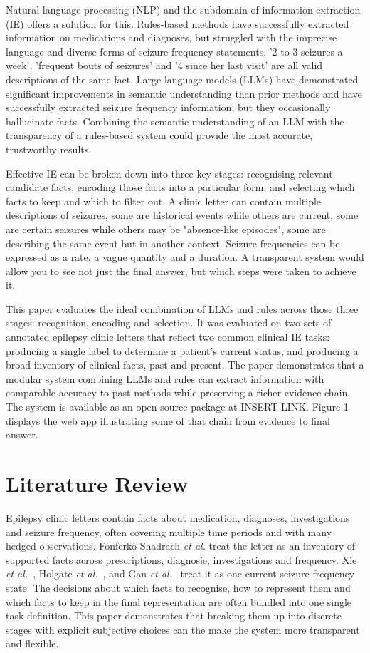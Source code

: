 \documentclass[conference]{IEEEtran}
\begin{document}
Natural language processing (NLP) and the subdomain
of information extraction (IE) offers a solution for this. 
Rules-based methods have successfully extracted
information on medications and diagnoses, but struggled
with the imprecise language and diverse forms
of seizure frequency statements. '2 to 3 seizures a week', 
'frequent bouts of seizures' and '4 since her last visit' are
all valid descriptions of the same fact. Large language 
models (LLMs) have demonstrated significant 
improvements in semantic understanding than prior 
methods and have successfully extracted seizure 
frequency information, but they occasionally hallucinate
facts. Combining the semantic understanding of an LLM
with the transparency of a rules-based system could
provide the most accurate, trustworthy results.

Effective IE can be broken down into three key stages: 
recognising relevant candidate facts, encoding those facts 
into a particular form, and selecting which facts to keep 
and which to filter out. A clinic letter can contain multiple 
descriptions of seizures, some are historical events while 
others are current, some are certain seizures while others 
may be "absence-like episodes", some are describing the 
same event but in another context. Seizure frequencies 
can be expressed as a rate, a vague quantity and a 
duration. A transparent system would allow you to see not 
just the final answer, but which steps were taken to achieve 
it.

This paper evaluates the ideal combination of LLMs and 
rules across those three stages: recognition, encoding and 
selection. It was evaluated on two sets of annotated 
epilepsy clinic letters that reflect two common clinical IE 
tasks: producing a single label to determine a patient's 
current status, and producing a broad inventory of clinical 
facts, past and present. The paper demonstrates that a 
modular system combining LLMs and rules can extract 
information with comparable accuracy to past methods 
while preserving a richer evidence chain. The system 
is available as an open source package at INSERT LINK.
Figure 1 displays the web app illustrating some of that 
chain from evidence to final answer.

\section{Literature Review}

Epilepsy clinic letters contain facts about medication, 
diagnoses, investigations and seizure frequency, often
covering multiple time periods and with many hedged\cite{b1}
observations. Fonferko-Shadrach \emph{et al.} treat the 
letter as an inventory of supported facts across prescriptions, 
diagnosie, investigations and frequency\cite{b1,b2}. 
Xie \emph{et al.}~\cite{b3}, Holgate \emph{et al.}~\cite{b4}, and 
Gan \emph{et al.}~\cite{b3} treat it as one current 
seizure-frequency state. The decisions about which facts
to recognise, how to represent them and which facts to keep
in the final representation are often bundled into one 
single task definition. This paper demonstrates that 
breaking them up into discrete stages with explicit 
subjective choices can the make the system more 
transparent and flexible.
\end{document}
